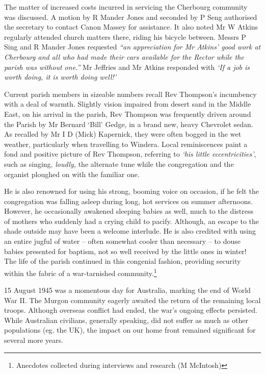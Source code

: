 The matter of increased costs incurred in servicing the Cherbourg community was discussed. A motion by R Mander Jones and seconded by P Seng authorised the secretary to contact Canon Massey for assistance. It also noted Mr W Atkins regularly attended church matters there, riding his bicycle between. Messrs P Sing and R Mander Jones requested \emph{``an appreciation for Mr Atkins' good work at Cherbourg and all who had made their cars available for the Rector while the parish was without one.''} Mr Jeffries and Mr Atkins responded with \emph{`If a job is worth doing, it is worth doing well!'}



Current parish members in sizeable numbers recall Rev Thompson's incumbency with a deal of warmth. Slightly vision impaired from desert sand in the Middle East, on his arrival in the parish, Rev Thompson was frequently driven around the Parish by Mr Bernard `Bill' Gedge, in a brand new, heavy Chevrolet sedan. As recalled by Mr I D (Mick) Kapernick, they were often bogged in the wet weather, particularly when travelling to Windera. Local reminiscences paint a fond and positive picture of Rev Thompson, referring to \emph{`his little eccentricities'}, such as singing, \emph{loudly,} the alternate tune while the congregation and the organist ploughed on with the familiar one.



He is also renowned for using his strong, booming voice on occasion, if he felt the congregation was falling asleep during long, hot services on summer afternoons. However, he occasionally awakened sleeping babies as well, much to the distress of mothers who suddenly had a crying child to pacify. Although, an escape to the shade outside may have been a welcome interlude. He is also credited with using an entire jugful of water -- often somewhat cooler than necessary -- to douse babies presented for baptism, not so well received by the little ones in winter! The life of the parish continued in this congenial fashion, providing security within the fabric of a war-tarnished community.\footnote{Anecdotes collected during interviews and research (M McIntosh)}


15 August 1945 was a momentous day for Australia, marking the end of World War II. The Murgon community eagerly awaited the return of the remaining local troops. Although overseas conflict had ended, the war's ongoing effects persisted. While Australian civilians, generally speaking, did not suffer as much as other populations (eg. the UK), the impact on our home front remained significant for several more years.









